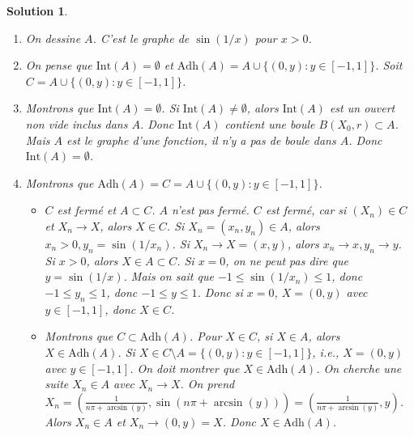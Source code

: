 \documentclass{article}
\newtheorem{solution}{Solution}
\begin{document}
\begin{solution}
\begin{enumerate}
    \item On dessine $A$. C'est le graphe de $\sin(1/x)$ pour $x > 0$.
    \item On pense que $\mathrm{Int}(A) = \emptyset$ et $\mathrm{Adh}(A) = A \cup \{(0,y) : y \in [-1, 1]\}$. Soit $C = A \cup \{(0,y) : y \in [-1, 1]\}$.
    \item Montrons que $\mathrm{Int}(A) = \emptyset$. Si $\mathrm{Int}(A) \neq \emptyset$, alors $\mathrm{Int}(A)$ est un ouvert non vide inclus dans $A$. Donc $\mathrm{Int}(A)$ contient une boule $B(X_0, r) \subset A$. Mais $A$ est le graphe d'une fonction, il n'y a pas de boule dans $A$. Donc $\mathrm{Int}(A) = \emptyset$.
    \item Montrons que $\mathrm{Adh}(A) = C = A \cup \{(0,y) : y \in [-1, 1]\}$.
    \begin{itemize}
        \item $C$ est fermé et $A \subset C$. $A$ n'est pas fermé. $C$ est fermé, car si $(X_n) \in C$ et $X_n \to X$, alors $X \in C$. Si $X_n = (x_n, y_n) \in A$, alors $x_n > 0, y_n = \sin(1/x_n)$. Si $X_n \to X = (x, y)$, alors $x_n \to x, y_n \to y$. Si $x > 0$, alors $X \in A \subset C$. Si $x = 0$, on ne peut pas dire que $y = \sin(1/x)$. Mais on sait que $-1 \leq \sin(1/x_n) \leq 1$, donc $-1 \leq y_n \leq 1$, donc $-1 \leq y \leq 1$. Donc si $x = 0$, $X = (0, y)$ avec $y \in [-1, 1]$, donc $X \in C$.
        \item Montrons que $C \subset \mathrm{Adh}(A)$. Pour $X \in C$, si $X \in A$, alors $X \in \mathrm{Adh}(A)$. Si $X \in C \setminus A = \{(0,y) : y \in [-1, 1]\}$, i.e., $X = (0, y)$ avec $y \in [-1, 1]$. On doit montrer que $X \in \mathrm{Adh}(A)$. On cherche une suite $X_n \in A$ avec $X_n \to X$. On prend $X_n = (\frac{1}{n \pi + \arcsin(y)}, \sin(n \pi + \arcsin(y))) = (\frac{1}{n \pi + \arcsin(y)}, y)$. Alors $X_n \in A$ et $X_n \to (0, y) = X$. Donc $X \in \mathrm{Adh}(A)$.
    \end{itemize}
\end{enumerate}
\end{solution}
\end{document}
